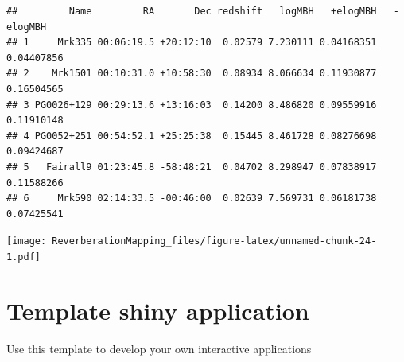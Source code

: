 \documentclass[]{article}
\newenvironment{Shaded}{\begin{snugshade}}{\end{snugshade}}
\newcommand{\KeywordTok}[1]{\textcolor[rgb]{0.13,0.29,0.53}{\textbf{#1}}}
\newcommand{\NormalTok}[1]{#1}
\newcommand{\OperatorTok}[1]{\textcolor[rgb]{0.81,0.36,0.00}{\textbf{#1}}}
\begin{document}
\begin{verbatim}
##         Name         RA       Dec redshift   logMBH   +elogMBH   -elogMBH
## 1     Mrk335 00:06:19.5 +20:12:10  0.02579 7.230111 0.04168351 0.04407856
## 2    Mrk1501 00:10:31.0 +10:58:30  0.08934 8.066634 0.11930877 0.16504565
## 3 PG0026+129 00:29:13.6 +13:16:03  0.14200 8.486820 0.09559916 0.11910148
## 4 PG0052+251 00:54:52.1 +25:25:38  0.15445 8.461728 0.08276698 0.09424687
## 5   Fairall9 01:23:45.8 -58:48:21  0.04702 8.298947 0.07838917 0.11588266
## 6     Mrk590 02:14:33.5 -00:46:00  0.02639 7.569731 0.06181738 0.07425541
\end{verbatim}

\begin{Shaded}
\end{Shaded}

\texttt{[image: ReverberationMapping\_files/figure-latex/unnamed-chunk-24-1.pdf]}

\hypertarget{template-shiny-application}{%
\section{Template shiny application}\label{template-shiny-application}}

Use this template to develop your own interactive applications
\end{document}
